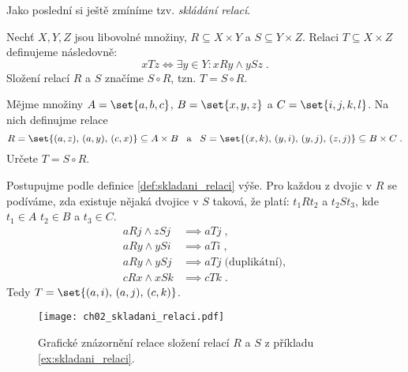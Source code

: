 Jako poslední si ještě zmíníme tzv. \emph{skládání relací}.
\begin{definition}\label{def:skladani_relaci}
    Nechť $X,Y,Z$ jsou libovolné množiny, $R\subseteq X\times Y$ a $S\subseteq Y\times Z$. Relaci $T\subseteq X\times Z$ definujeme následovně:
    \begin{equation*}
        xTz \iff \exists y\in Y : xRy \land ySz\; .
    \end{equation*}
    Složení relací $R$ a $S$ značíme $S\circ R$, tzn. $T=S\circ R$.
\end{definition}
\begin{example}\label{ex:skladani_relaci}
    Mějme množiny $A=\set{a,b,c}$, $B=\set{x,y,z}$ a $C=\set{i,j,k,l}$. Na nich definujme relace
    \begin{equation*}
        R=\set{(a,z),\,(a,y),\,(c,x)}\subseteq A\times B\;\;\;\text{a}\;\;\;S=\set{(x,k),\,(y,i),\,(y,j),\,(z,j)}\subseteq B\times C\; .
    \end{equation*}
    Určete $T=S\circ R$.
\end{example}
\begin{solution}
    Postupujme podle definice \ref{def:skladani_relaci} výše. Pro každou z dvojic v $R$ se podíváme, zda existuje nějaká dvojice v $S$ taková, že platí: $t_1Rt_2$ a $t_2St_3$, kde $t_1\in A$ $t_2\in B$ a $t_3\in C$.
    \begin{align*}
        aRj \land zSj &\implies aTj\; ,\\
        aRy \land ySi &\implies aTi\; ,\\
        aRy \land ySj &\implies aTj\;\text{(duplikátní)},\\
        cRx \land xSk &\implies cTk\; .
    \end{align*}
    Tedy $T=\set{(a,i),\,(a,j),\,(c,k)}$.
\end{solution}
\begin{figure}[h]
    \centering
    \texttt{[image: ch02\_skladani\_relaci.pdf]}
    \caption{Grafické znázornění relace složení relací $R$ a $S$ z příkladu \ref{ex:skladani_relaci}.}
    \label{fig:relace_mezi_mnozinami}
\end{figure}

